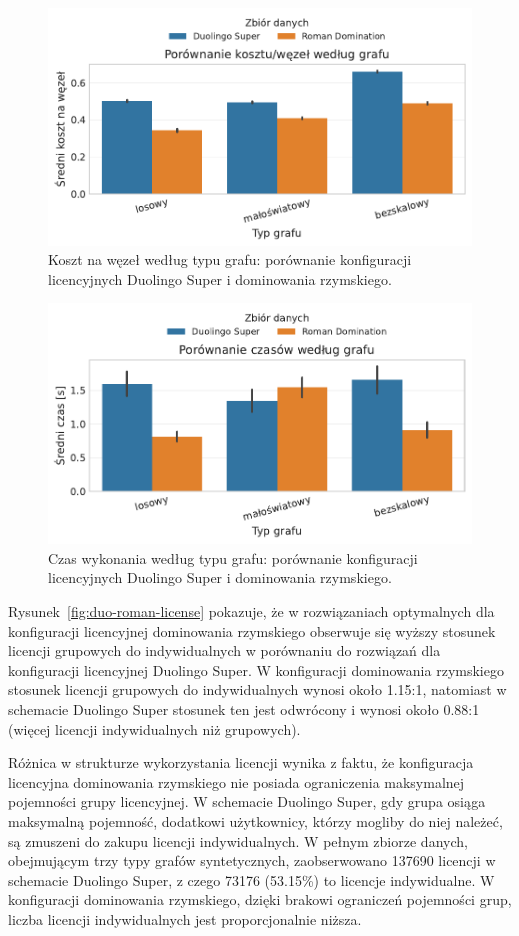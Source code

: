 \begin{figure}[H]
  \centering
  \includegraphics[width=0.6\linewidth]{assets/figures/benchmark/real/duo_vs_roman_cost_per_node_by_graph.pdf}
  \caption{Koszt na węzeł według typu grafu: porównanie konfiguracji licencyjnych Duolingo Super i dominowania rzymskiego.}
  \label{fig:duo-roman-cost}
\end{figure}

\begin{figure}[H]
  \centering
  \includegraphics[width=0.6\linewidth]{assets/figures/benchmark/real/duo_vs_roman_time_by_graph.pdf}
  \caption{Czas wykonania według typu grafu: porównanie konfiguracji licencyjnych Duolingo Super i dominowania rzymskiego.}
  \label{fig:duo-roman-time}
\end{figure}

Rysunek~\ref{fig:duo-roman-license} pokazuje, że w rozwiązaniach optymalnych dla konfiguracji licencyjnej dominowania rzymskiego obserwuje się wyższy stosunek licencji grupowych do indywidualnych w porównaniu do rozwiązań dla konfiguracji licencyjnej Duolingo Super. W konfiguracji dominowania rzymskiego stosunek licencji grupowych do indywidualnych wynosi około 1.15:1, natomiast w schemacie Duolingo Super stosunek ten jest odwrócony i wynosi około 0.88:1 (więcej licencji indywidualnych niż grupowych).

Różnica w strukturze wykorzystania licencji wynika z faktu, że konfiguracja licencyjna dominowania rzymskiego nie posiada ograniczenia maksymalnej pojemności grupy licencyjnej. W schemacie Duolingo Super, gdy grupa osiąga maksymalną pojemność, dodatkowi użytkownicy, którzy mogliby do niej należeć, są zmuszeni do zakupu licencji indywidualnych. W pełnym zbiorze danych, obejmującym trzy typy grafów syntetycznych, zaobserwowano 137690 licencji w schemacie Duolingo Super, z czego 73176 (53.15\%) to licencje indywidualne. W konfiguracji dominowania rzymskiego, dzięki brakowi ograniczeń pojemności grup, liczba licencji indywidualnych jest proporcjonalnie niższa.

